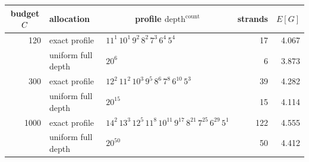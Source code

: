 {\setlength{\tabcolsep}{4pt}%
\begin{tabular}{rllrr}
\toprule
\multicolumn{1}{c}{budget $C$} & allocation & \multicolumn{1}{c}{profile $\mathrm{depth}^{\mathrm{count}}$} & \multicolumn{1}{c}{strands} & \multicolumn{1}{c}{$E[G]$} \\
\midrule
120 & exact profile & $11^{1}\,10^{1}\,9^{2}\,8^{2}\,7^{3}\,6^{4}\,5^{4}$ & 17 & 4.067 \\
 & uniform full depth & $20^{6}$ & 6 & 3.873 \\
300 & exact profile & $12^{2}\,11^{2}\,10^{3}\,9^{5}\,8^{6}\,7^{8}\,6^{10}\,5^{3}$ & 39 & 4.282 \\
 & uniform full depth & $20^{15}$ & 15 & 4.114 \\
1000 & exact profile & $14^{2}\,13^{3}\,12^{5}\,11^{8}\,10^{11}\,9^{17}\,8^{21}\,7^{25}\,6^{29}\,5^{1}$ & 122 & 4.555 \\
 & uniform full depth & $20^{50}$ & 50 & 4.412 \\
\bottomrule
\end{tabular}
}